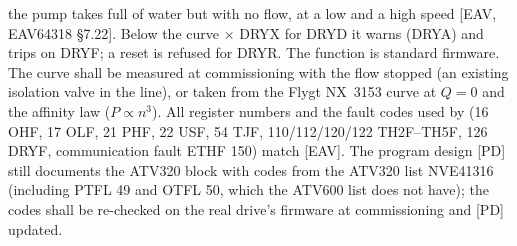 \documentclass[11pt,a4paper]{article}
\begin{document}
the pump takes full of water but with no flow, at a low and a high speed [EAV, EAV64318 \S7.22]. Below
the curve $\times$ DRYX for DRYD it warns (DRYA) and trips on DRYF; a reset is refused for DRYR. The
function is standard firmware. The curve shall be measured at commissioning with the flow stopped (an
existing isolation valve in the line), or taken from the Flygt NX~3153 curve at $Q = 0$ and the
affinity law ($P \propto n^3$).
All register numbers and the fault codes used by  (16 OHF, 17 OLF, 21 PHF,
22 USF, 54 TJF, 110/112/120/122 TH2F--TH5F, 126 DRYF, communication fault ETHF 150) match [EAV]. The program
design [PD] still documents the ATV320 block with codes from the ATV320 list NVE41316 (including
PTFL 49 and OTFL 50, which the ATV600 list does not have); the codes shall be re-checked on the
real drive's firmware at commissioning and [PD] updated.
\end{document}
